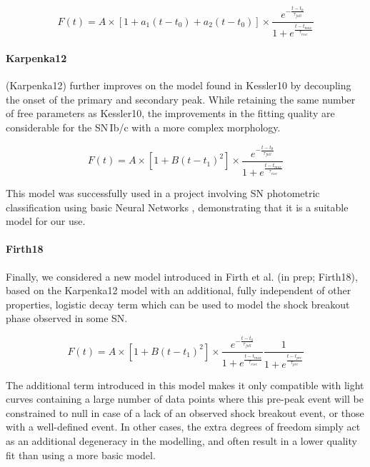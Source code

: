 \begin{equation}
  F(t) = A \times [1 + a_1(t - {t_0}) + a_2(t - {t_0})] \times \frac{e^{-\frac{t - t_{0}}{\tau_{fall}}}} {1 + e^{\frac{t - t_{max}}{\tau_{rise}}}}
\end{equation}

\paragraph{Karpenka12}
\citet{Karpenka2012} (Karpenka12) further improves on the model found in Kessler10 by decoupling the onset of the primary and secondary peak. While retaining the same number of free parameters as Kessler10, the improvements in the fitting quality are considerable for the SN\,Ib/c with a more complex morphology.

\begin{equation}
  F(t) = A \times [1 + B(t - {t_1})^2] \times \frac{e^{-\frac{t - t_{0}}{\tau_{fall}}}} {1 + e^{\frac{t - t_{max}}{\tau_{rise}}}}
\end{equation}

This model was successfully used in a project involving SN photometric classification using basic Neural Networks \citep{Karpenka2012}, demonstrating that it is a suitable model for our use.

\paragraph{Firth18}
Finally, we considered a new model introduced in Firth et al. (in prep; Firth18), based on the Karpenka12 model with an additional, fully independent of other properties, logistic decay term which can be used to model the shock breakout phase observed in some SN.

\begin{equation}
  F(t) = A \times [1 + B(t - {t_1})^2] \times \frac{e^{-\frac{t - t_{0}}{\tau_{fall}}}} {1 + e^{\frac{t - t_{max}}{\tau_{rise}}}} \frac{1}{1 + e^{\frac{t - t_{pre}}{\tau_{pre}}}}
\end{equation}

The additional term introduced in this model makes it only compatible with light curves containing a large number of data points where this pre-peak event will be constrained to null in case of a lack of an observed shock breakout event, or those with a well-defined event. In other cases, the extra degrees of freedom simply act as an additional degeneracy in the modelling, and often result in a lower quality fit than using a more basic model.

